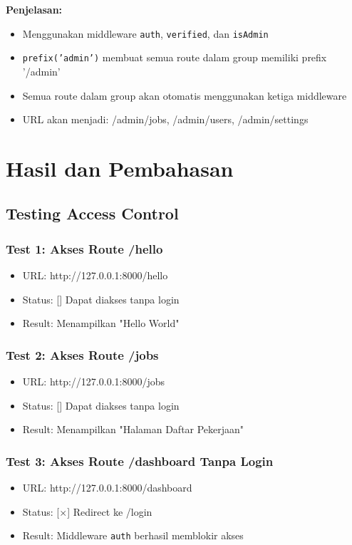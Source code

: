 \documentclass[a4paper,oneside,11pt]{book}
\begin{document}
\textbf{Penjelasan:}
\begin{itemize}
    \item Menggunakan middleware \texttt{auth}, \texttt{verified}, dan \texttt{isAdmin}
    \item \texttt{prefix('admin')} membuat semua route dalam group memiliki prefix '/admin'
    \item Semua route dalam group akan otomatis menggunakan ketiga middleware
    \item URL akan menjadi: /admin/jobs, /admin/users, /admin/settings
\end{itemize}

\chapter{Hasil dan Pembahasan}

\section{Testing Access Control}

\subsection{Test 1: Akses Route /hello}
\begin{itemize}
    \item URL: http://127.0.0.1:8000/hello
    \item Status: [\checkmark] Dapat diakses tanpa login
    \item Result: Menampilkan "Hello World"
\end{itemize}

\subsection{Test 2: Akses Route /jobs}
\begin{itemize}
    \item URL: http://127.0.0.1:8000/jobs
    \item Status: [\checkmark] Dapat diakses tanpa login
    \item Result: Menampilkan "Halaman Daftar Pekerjaan"
\end{itemize}

\subsection{Test 3: Akses Route /dashboard Tanpa Login}
\begin{itemize}
    \item URL: http://127.0.0.1:8000/dashboard
    \item Status: [$\times$] Redirect ke /login
    \item Result: Middleware \texttt{auth} berhasil memblokir akses
\end{itemize}
\end{document}
